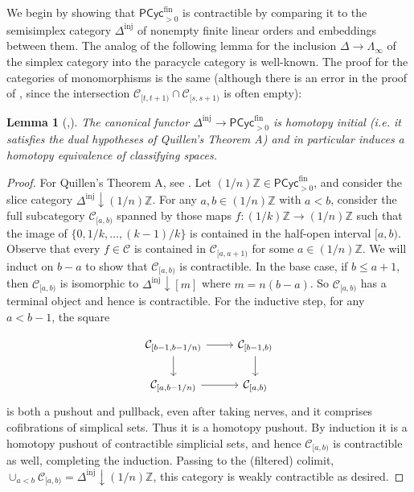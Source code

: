 \documentclass{amsart}
\theoremstyle{plain}
\newtheorem{lem}[thm]{Lemma}
\theoremstyle{definition}
\newcommand{\ints}{\mathbb{Z}}
\newcommand{\calC}{\mathcal{C}}
\newcommand{\fin}{\mathrm{fin}}
\newcommand{\Paracyc}{\mathsf{PCyc}}
\newcommand{\inj}{\mathrm{inj}}
\begin{document}
We begin by showing that $\Paracyc_{>0}^\fin$ is contractible by comparing it to the semisimplex category $\Delta^\inj$ of nonempty finite linear orders and embeddings between them. The analog of the following lemma for the inclusion $\Delta \to \Lambda_\infty$ of the simplex category into the paracycle category is well-known. The proof for the categories of monomorphisms is the same (although there is an error in the proof of \cite[Theorem B.3]{nikolaus-scholze}, since the intersection $\calC_{[t,t+1)} \cap \calC_{[s,s+1)}$ is often empty):

\begin{lem}[{\cite[8.5.15]{cisinski},\cite[Theorem B.3]{nikolaus-scholze}}]\label{lem:delta-paracyc}
The canonical functor $\Delta^\inj \to \Paracyc^\fin_{>0}$ is homotopy initial (i.e. it satisfies the dual hypotheses of Quillen's Theorem A) and in particular induces a homotopy equivalence of classifying spaces.
\end{lem}
\begin{proof}
For Quillen's Theorem A, see \cite[Theorem A]{quillen}. Let $(1/n)\ints \in \Paracyc^\fin_{>0}$, and consider the slice category $\Delta^\inj \downarrow (1/n)\ints$. For any $a,b\in (1/n)\ints$ with $a < b$, consider the full subcategory $\calC_{[a,b)}$ spanned by those maps $f : (1/k)\ints \to (1/n)\ints$ such that the image of $\{0,1/k,\dots,(k-1)/k\}$ is contained in the half-open interval $[a,b)$. Observe that every $f \in \calC$ is contained in $\calC_{[a,a+1)}$ for some $a \in (1/n)\ints$. We will induct on $b-a$ to show that $\calC_{[a,b)}$ is contractible. In the base case, if $b \leq a+1$, then $\calC_{[a,b)}$ is isomorphic to $\Delta^\inj \downarrow [m]$ where $m = n(b-a)$.  So $\calC_{[a,b)}$ has a terminal object and hence is contractible. For the inductive step, for any $a < b-1$, the square

\begin{equation*}
\begin{tikzcd}
\calC_{[b-1,b - 1/n)} \ar[r] \ar[d] & \calC_{[b-1,b)} \ar[d] \\
\calC_{[a,b - 1/n)} \ar[r] & \calC_{[a,b)}
\end{tikzcd}
\end{equation*}
% 
is both a pushout and pullback, even after taking nerves, and it comprises cofibrations of simplical sets. Thus it is a homotopy pushout. By induction it is a homotopy pushout of contractible simplicial sets, and hence $\calC_{[a,b)}$ is contractible as well, completing the induction. Passing to the (filtered) colimit, $\cup_{a<b} \calC_{[a,b)} = \Delta^\inj \downarrow (1/n)\ints$, this category is weakly contractible as desired.
\end{proof}
\end{document}
